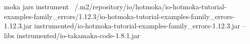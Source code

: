\begin{shellcommandbox}\begin{ttlst}
moka jars instrument ~/.m2/repository/io/hotmoka/io-hotmoka-tutorial-examples-family_errors/1.12.3/io-hotmoka-tutorial-examples-family_errors-1.12.3.jar instrumented/io-hotmoka-tutorial-examples-family_errors-1.12.3.jar --libs instrumented/io-takamaka-code-1.8.1.jar
\end{ttlst}\end{shellcommandbox}
